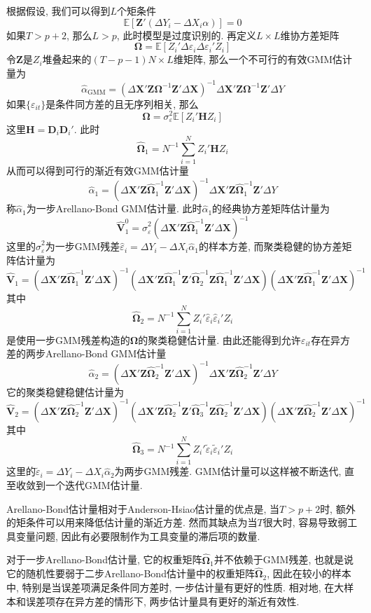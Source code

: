 \documentclass[cn, 12pt, math=mtpro2, bibstyle=apa, blue, twocol]{elegantbook}
\newcommand{\E}{\mathbb{E}}
\newcommand{\X}{\mathbold{X}}
\newcommand{\Z}{\mathbold{Z}}
\newcommand{\V}{\mathbold{V}}
\newcommand{\BO}{\mathbold{\Omega}}
\begin{document}
根据假设, 我们可以得到$L$个矩条件
$$\E[\Z'(\Delta Y_i-\Delta X_i\alpha)]=0$$
如果$T>p+2$, 那么$L>p$, 此时模型是过度识别的. 再定义$L\times L$维协方差矩阵
$$\BO=\E[Z_i'\Delta \varepsilon_i\Delta\varepsilon_i'Z_i]$$
令$\Z$是$Z_i$堆叠起来的$(T-p-1)N\times L$维矩阵, 那么一个不可行的有效GMM估计量为
$$\hat{\alpha}_\text{GMM}=(\Delta \X'\Z\BO^{-1}\Z'\Delta\X)^{-1}\Delta \X'\Z\BO^{-1}\Z'\Delta Y$$
如果$\{\varepsilon_{it}\}$是条件同方差的且无序列相关, 那么
$$\BO=\sigma_\varepsilon^2\E[Z_i'\mathbold{H}Z_i]$$
这里$\mathbold{H}=\mathbold{D}_i\mathbold{D}_i'$. 此时
$$\hat{\BO}_1=N^{-1}\sum_{i=1}^{N}Z_i'\mathbold{H}Z_i$$
从而可以得到可行的渐近有效GMM估计量
$$\hat{\alpha}_1=(\Delta\X'\Z\hat{\BO}_1^{-1}\Z'\Delta\X)^{-1}\Delta\X'\Z\hat{\BO}_1^{-1}\Z'\Delta Y$$
称$\hat{\alpha}_1$为一步Arellano-Bond GMM估计量. 此时$\hat{\alpha}_1$的经典协方差矩阵估计量为
$$\hat{\V}_1^0=\hat{\sigma}_\varepsilon^2(\Delta\X'\Z\hat{\BO}_1^{-1}\Z'\Delta\X)^{-1}$$
这里的$\hat{\sigma}_\varepsilon^2$为一步GMM残差$\hat{\varepsilon}_i=\Delta Y_i-\Delta X_i\hat{\alpha}_1$的样本方差, 而聚类稳健的协方差矩阵估计量为
$$\hat{\V}_1=(\Delta\X'\Z\hat{\BO}_1^{-1}\Z'\Delta\X)^{-1}(\Delta\X'\Z\hat{\BO}_1^{-1}\Z'\hat{\BO}_2^{-1}\Z\hat{\BO}_1^{-1}\Z'\Delta\X)(\Delta\X'\Z\hat{\BO}_1^{-1}\Z'\Delta\X)^{-1}$$
其中
$$\hat{\BO}_2=N^{-1}\sum_{i=1}^{N}Z_i'\hat{\varepsilon}_i\hat{\varepsilon}_i'Z_i$$
是使用一步GMM残差构造的$\BO$的聚类稳健估计量. 由此还能得到允许$\varepsilon_{it}$存在异方差的两步Arellano-Bond GMM估计量
$$\hat{\alpha}_2=(\Delta\X'\Z\hat{\BO}_2^{-1}\Z'\Delta\X)^{-1}\Delta\X'\Z\hat{\BO}_2^{-1}\Z'\Delta Y$$
它的聚类稳健稳健估计量为
$$\hat{\V}_2=(\Delta\X'\Z\hat{\BO}_2^{-1}\Z'\Delta\X)^{-1}(\Delta\X'\Z\hat{\BO}_2^{-1}\Z'\hat{\BO}_3^{-1}\Z\hat{\BO}_2^{-1}\Z'\Delta\X)(\Delta\X'\Z\hat{\BO}_2^{-1}\Z'\Delta\X)^{-1}$$
其中
$$\hat{\BO}_3=N^{-1}\sum_{i=1}^{N}Z_i'\tilde{\varepsilon}_i\tilde{\varepsilon}_i'Z_i$$
这里的$\tilde{\varepsilon}_{i}=\Delta Y_i-\Delta X_i\hat{\alpha}_2$为两步GMM残差. GMM估计量可以这样被不断迭代, 直至收敛到一个迭代GMM估计量.

Arellano-Bond估计量相对于Anderson-Hsiao估计量的优点是, 当$T>p+2$时, 额外的矩条件可以用来降低估计量的渐近方差. 然而其缺点为当$T$很大时, 容易导致弱工具变量问题, 因此有必要限制作为工具变量的滞后项的数量.

对于一步Arellano-Bond估计量, 它的权重矩阵$\hat{\BO}_1$并不依赖于GMM残差, 也就是说它的随机性要弱于二步Arellano-Bond估计量中的权重矩阵$\hat{\BO}_2$, 因此在较小的样本中, 特别是当误差项满足条件同方差时, 一步估计量有更好的性质. 相对地, 在大样本和误差项存在异方差的情形下, 两步估计量具有更好的渐近有效性.
\end{document}
